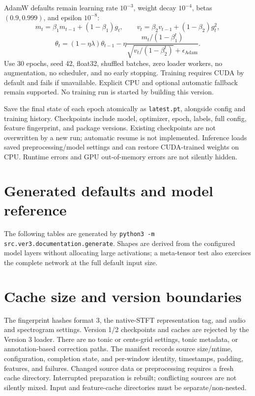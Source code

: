 \documentclass[11pt,a4paper]{article}
\begin{document}
AdamW defaults remain learning rate $10^{-3}$, weight decay $10^{-4}$,
betas $(0.9,0.999)$, and epsilon $10^{-8}$:
\[
m_t=\beta_1m_{t-1}+(1-\beta_1)g_t,\qquad
v_t=\beta_2v_{t-1}+(1-\beta_2)g_t^2,
\]
\[
\theta_t=(1-\eta\lambda)\theta_{t-1}
-\eta\frac{m_t/(1-\beta_1^t)}{\sqrt{v_t/(1-\beta_2^t)}+\epsilon_{\mathrm{Adam}}}.
\]
Use 30 epochs, seed 42, float32, shuffled batches, zero loader workers, no
augmentation, no scheduler, and no early stopping. Training requires CUDA by
default and fails if unavailable. Explicit CPU and optional automatic fallback
remain supported. No training run is started by building this version.

Save the final state of each epoch atomically as \texttt{latest.pt}, alongside
config and training history. Checkpoints include model, optimizer, epoch, labels,
full config, feature fingerprint, and package versions. Existing checkpoints are
not overwritten by a new run; automatic resume is not implemented. Inference
loads saved preprocessing/model settings and can restore CUDA-trained weights
on CPU. Runtime errors and GPU out-of-memory errors are not silently hidden.

\section{Generated defaults and model reference}
The following tables are generated by
\texttt{python3 -m src.ver3.documentation.generate}. Shapes are derived from the
configured model layers without allocating large activations; a meta-tensor test
also exercises the complete network at the full default input size.


\section{Cache size and version boundaries}
The fingerprint hashes format 3, the native-STFT representation tag, and audio
and spectrogram settings. Version 1/2 checkpoints and caches are rejected by the
Version 3 loader. There are no tonic or cents-grid settings, tonic metadata, or
annotation-based correction paths. The manifest records source size/mtime,
configuration, completion state, and per-window identity, timestamps, padding,
features, and failures. Changed source data or preprocessing requires a fresh
cache directory. Interrupted preparation is rebuilt; conflicting sources are not
silently mixed. Input and feature-cache directories must be separate/non-nested.
\end{document}
